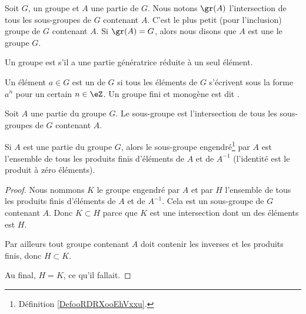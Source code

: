 \begin{definition}
    Soit \( G\), un groupe et \( A\) une partie de \( G\). Nous notons \( \gr(A)\) l'intersection de tous les sous-groupes de \( G\) contenant \( A\). C'est le plus petit (pour l'inclusion) groupe de \( G\) contenant \( A\). Si \( \gr(A)=G\), alors nous disons que \( A\) est une  le groupe \( G\).

    Un groupe est  s'il a une partie génératrice réduite à un seul élément.
\end{definition}

\begin{definition}     \label{DefHFJWooFxkzCF}
    Un élément \( a\in G\) est un  de \( G\) si tous les éléments de \( G\) s'écrivent sous la forme \( a^n\) pour un certain \( n\in\eZ\). Un groupe fini et monogène est dit .
\end{definition}

\begin{definition}        \label{DefooRDRXooEhVxxu}
    Soit \( A\) une partie du groupe \( G\). Le sous-groupe  est l'intersection de tous les sous-groupes de \( G\) contenant \( A\).
\end{definition}

\begin{lemma}   \label{LemFUIZooBZTCiy}
    Si \( A\) est une partie du groupe \( G\), alors le sous-groupe engendré\footnote{Définition \ref{DefooRDRXooEhVxxu}.} par \( A\) est l'ensemble de tous les produits finis d'éléments de \( A\) et de \( A^{-1}\) (l'identité est le produit à zéro éléments).
\end{lemma}

\begin{proof}
    Nous nommons \( K\) le groupe engendré par \( A\) et par \( H\) l'ensemble de tous les produits finis d'éléments de \( A\) et de \( A^{-1}\). Cela est un sous-groupe de \( G\) contenant \( A\). Donc \( K\subset H\) parce que \( K\) est une intersection dont un des éléments est \( H\).

    Par ailleurs tout groupe contenant \( A\) doit contenir les inverses et les produits finis, donc \( H\subset K\). 

    Au final, \( H=K\), ce qu'il fallait.
\end{proof}

